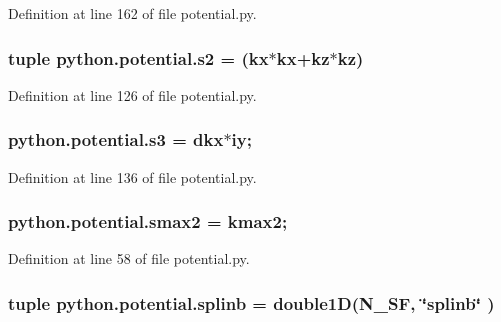 Definition at line 162 of file potential.\-py.

\hypertarget{namespacepython_1_1potential_a1b3e405983514f1a0352b2e81b6d78c7}{
\subsubsection[{s2}]{\setlength{\rightskip}{0pt plus 5cm}tuple python.\-potential.\-s2 = ({\bf kx}$\ast${\bf kx}+{\bf kz}$\ast${\bf kz})}}\label{namespacepython_1_1potential_a1b3e405983514f1a0352b2e81b6d78c7}


Definition at line 126 of file potential.\-py.

\hypertarget{namespacepython_1_1potential_aa1ee7b77b19a1a1c402c98755b2bb9c1}{
\subsubsection[{s3}]{\setlength{\rightskip}{0pt plus 5cm}python.\-potential.\-s3 = {\bf dkx}$\ast${\bf iy};}}\label{namespacepython_1_1potential_aa1ee7b77b19a1a1c402c98755b2bb9c1}


Definition at line 136 of file potential.\-py.

\hypertarget{namespacepython_1_1potential_a5d356bc162350b5aa36a7de9864c654a}{
\subsubsection[{smax2}]{\setlength{\rightskip}{0pt plus 5cm}python.\-potential.\-smax2 = {\bf kmax2};}}\label{namespacepython_1_1potential_a5d356bc162350b5aa36a7de9864c654a}


Definition at line 58 of file potential.\-py.

\hypertarget{namespacepython_1_1potential_ad24bd3f9256b68c806f91729b5424549}{
\subsubsection[{splinb}]{\setlength{\rightskip}{0pt plus 5cm}tuple python.\-potential.\-splinb = double1\-D({\bf N\-\_\-\-S\-F}, \char`\"{}splinb\char`\"{} )}}\label{namespacepython_1_1potential_ad24bd3f9256b68c806f91729b5424549}


